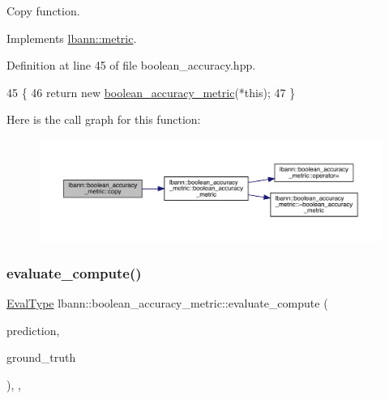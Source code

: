 Copy function. 

Implements \hyperlink{classlbann_1_1metric_a2a4498d41f77da8585552f485caab167}{lbann\+::metric}.



Definition at line 45 of file boolean\+\_\+accuracy.\+hpp.


\begin{DoxyCode}
45                                                  \{
46     \textcolor{keywordflow}{return} \textcolor{keyword}{new} \hyperlink{classlbann_1_1boolean__accuracy__metric_a91e8f2a608e0594e8875c58d584bda9c}{boolean\_accuracy\_metric}(*\textcolor{keyword}{this});
47   \}
\end{DoxyCode}
Here is the call graph for this function\+:\nopagebreak
\begin{figure}[H]
\begin{center}
\leavevmode
\includegraphics[width=350pt]{classlbann_1_1boolean__accuracy__metric_ae3a97a9ac1caccfe8ac46ad1a0df01a4_cgraph}
\end{center}
\end{figure}
\mbox{\label{classlbann_1_1boolean__accuracy__metric_acac2d198f516990fe9b87f3abefae635}} 
\subsubsection{\texorpdfstring{evaluate\+\_\+compute()}{evaluate\_compute()}}
{\footnotesize\ttfamily \hyperlink{base_8hpp_a3266f5ac18504bbadea983c109566867}{Eval\+Type} lbann\+::boolean\+\_\+accuracy\+\_\+metric\+::evaluate\+\_\+compute (\begin{DoxyParamCaption}\item[{const \hyperlink{base_8hpp_a9a697a504ae84010e7439ffec862b470}{Abs\+Dist\+Mat} \&}]{prediction,  }\item[{const \hyperlink{base_8hpp_a9a697a504ae84010e7439ffec862b470}{Abs\+Dist\+Mat} \&}]{ground\+\_\+truth }\end{DoxyParamCaption})\hspace{0.3cm}{\ttfamily [override]}, {\ttfamily [protected]}, {\ttfamily [virtual]}}

